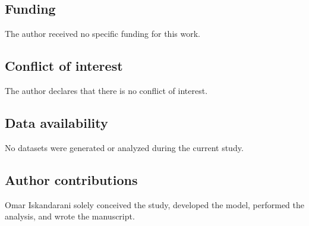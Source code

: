 \documentclass[11pt,a4paper]{article}
\begin{document}
        \subsection*{Funding}
            The author received no specific funding for this work.

        \subsection*{Conflict of interest}
            The author declares that there is no conflict of interest.

        \subsection*{Data availability}
            No datasets were generated or analyzed during the current study.

        \subsection*{Author contributions}
            Omar Iskandarani solely conceived the study, developed the model, performed the analysis, and wrote the manuscript.
\end{document}
